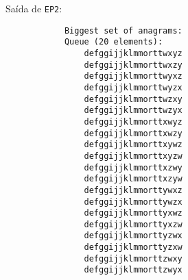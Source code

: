 \documentclass[a4paper]{article}
\newcommand{\ttt}{\texttt}
\begin{document}
        Saída de \ttt{EP2}:
        \begin{lstlisting}
            Biggest set of anagrams:
            Queue (20 elements):
                defggijjklmmorttwxyz
                defggijjklmmorttwxzy
                defggijjklmmorttwyxz
                defggijjklmmorttwyzx
                defggijjklmmorttwzxy
                defggijjklmmorttwzyx
                defggijjklmmorttxwyz
                defggijjklmmorttxwzy
                defggijjklmmorttxywz
                defggijjklmmorttxyzw
                defggijjklmmorttxzwy
                defggijjklmmorttxzyw
                defggijjklmmorttywxz
                defggijjklmmorttywzx
                defggijjklmmorttyxwz
                defggijjklmmorttyxzw
                defggijjklmmorttyzwx
                defggijjklmmorttyzxw
                defggijjklmmorttzwxy
                defggijjklmmorttzwyx

        \end{lstlisting}
\end{document}
